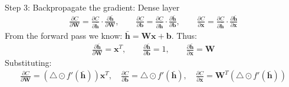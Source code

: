 \documentclass{beamer}
\begin{document}
	\begin{frame}{Step 3: Backpropagate the gradient: Dense layer}
		\begin{align*}
        \frac{\partial C}{\partial \mathbf{W}} = \frac{\partial C}{\partial \bar{\mathbf{h}}} \cdot \frac{\partial \bar{\mathbf{h}}}{\partial \mathbf{W}}, \quad \quad \frac{\partial C}{\partial \mathbf{b}} = \frac{\partial C}{\partial \bar{\mathbf{h}}} \cdot \frac{\partial \bar{\mathbf{h}}}{\partial \mathbf{b}}, \quad \quad \frac{\partial C}{\partial \mathbf{x}} = \frac{\partial C}{\partial \bar{\mathbf{h}}} \cdot \frac{\partial \bar{\mathbf{h}}}{\partial \mathbf{x}}
      \end{align*}
		From the forward pass we know: $\bar{\mathbf{h}} = \mathbf{W}\mathbf{x}+\mathbf{b}$. Thus:
		\begin{align*}
        \frac{\partial \bar{\mathbf{h}}}{\partial \mathbf{W}} =\mathbf{x}^T, \quad \quad \frac{\partial \bar{\mathbf{h}}}{\partial \mathbf{b}} =1, \quad \quad \frac{\partial \bar{\mathbf{h}}}{\partial \mathbf{x}} =\mathbf{W}
      \end{align*}
		Substituting:
		\begin{align*}
        \frac{\partial C}{\partial \mathbf{W}} = (\triangle \odot f'(\bar{\mathbf{h}}))\mathbf{x}^T, \quad \frac{\partial C}{\partial \mathbf{b}} = \triangle \odot f'(\bar{\mathbf{h}}), \quad \frac{\partial C}{\partial \mathbf{x}} = \mathbf{W}^T(\triangle \odot f'(\bar{\mathbf{h}}))
      \end{align*}
	\end{frame}
\end{document}
